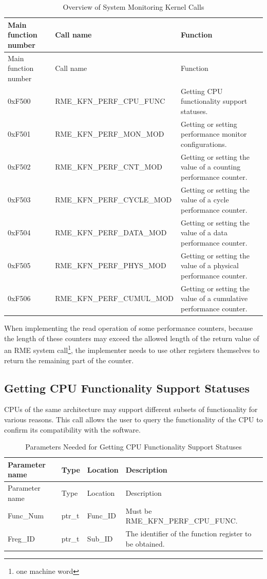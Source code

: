 \begin{xltabular}{\textwidth}{@{}>{\hsize\raggedright\arraybackslash}X>{\hsize\raggedright\arraybackslash}X>{\hsize\raggedright\arraybackslash}X@{}}
\caption{Overview of System Monitoring Kernel Calls}\label{tab:8-57-system-monitor-kernel-calls}\\
\toprule
Main function number & Call name & Function\tabularnewline
\endfirsthead
\toprule
Main function number & Call name & Function\tabularnewline
\midrule
\endhead
\bottomrule
\endlastfoot
0xF500 & RME\_KFN\_PERF\_CPU\_FUNC & Getting CPU functionality support statuses.\tabularnewline
0xF501 & RME\_KFN\_PERF\_MON\_MOD &
Getting or setting performance monitor configurations.\tabularnewline
0xF502 & RME\_KFN\_PERF\_CNT\_MOD &
Getting or setting the value of a counting performance counter.\tabularnewline
0xF503 & RME\_KFN\_PERF\_CYCLE\_MOD &
Getting or setting the value of a cycle performance counter.\tabularnewline
0xF504 & RME\_KFN\_PERF\_DATA\_MOD &
Getting or setting the value of a data performance counter.\tabularnewline
0xF505 & RME\_KFN\_PERF\_PHYS\_MOD &
Getting or setting the value of a physical performance counter.\tabularnewline
0xF506 & RME\_KFN\_PERF\_CUMUL\_MOD &
Getting or setting the value of a cumulative performance counter.\tabularnewline
\end{xltabular}
\nopagebreak[4]

When implementing the read operation of some performance counters, because the length of these counters may exceed the allowed length of the return value of an RME system call\footnote{one machine word}, the implementer needs to use other registers themselves to return the remaining part of the counter.

\subsection{Getting CPU Functionality Support Statuses}\label{subsec:8-get-cpu-features}

CPUs of the same architecture may support different subsets of functionality for various reasons. This call allows the user to query the functionality of the CPU to confirm its compatibility with the software.

\begin{xltabular}{\textwidth}{@{}>{\hsize\raggedright\arraybackslash}X>{\hsize\raggedright\arraybackslash}X>{\hsize\raggedright\arraybackslash}X>{\hsize\raggedright\arraybackslash}X@{}}
\caption{Parameters Needed for Getting CPU Functionality Support Statuses}\label{tab:8-58-get-cpu-features-parameters}\\
\toprule
Parameter name & Type & Location & Description\tabularnewline
\endfirsthead
\toprule
Parameter name & Type & Location & Description\tabularnewline
\midrule
\endhead
\bottomrule
\endlastfoot
Func\_Num & ptr\_t & Func\_ID & Must be RME\_KFN\_PERF\_CPU\_FUNC.\tabularnewline
Freg\_ID & ptr\_t & Sub\_ID & The identifier of the function register to be obtained.\tabularnewline
\end{xltabular}
\nopagebreak[4]

